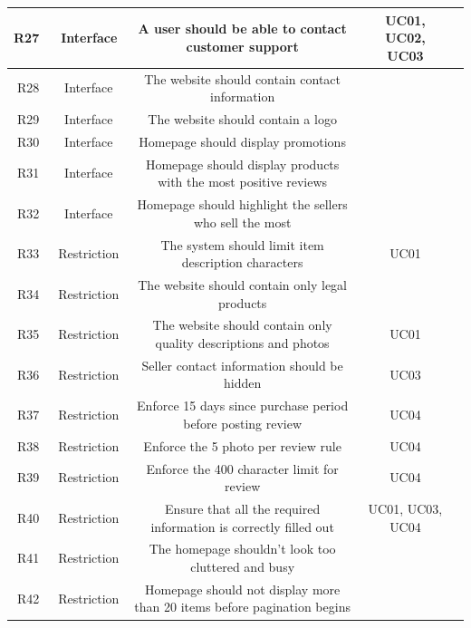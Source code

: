 \documentclass[11pt]{article}
\newcounter{use case ID}
\newcounter{req ID}
\begin{document}
\begin{table}[H]
\begin{adjustbox}{width=\columnwidth,center}
\begin{tabular}{|r | c| c | c| c|}
                R27 & \ Interface & A user should be able to contact customer support & UC01, UC02, UC03 &  \\
                \hline
                R28 & \ Interface & The website should contain contact \index{information}information & &  \\
                \hline
                R29 & \ Interface & The website should contain a logo & &  \\
                \hline
                R30 & \ Interface & Homepage should display promotions & &  \\
                \hline
                R31 & \ Interface & Homepage should display \index{product}products with the most positive \index{review}reviews & &  \\
                \hline
                R32 & \ Interface & Homepage should highlight the \index{seller}sellers who sell the most & &  \\
                \hline
                R33 & \ Restriction & The system should limit item description characters & UC01 &  \\
                \hline
                R34 & \ Restriction & The website should contain only legal \index{product}products & &  \\
                \hline
                R35 & \ Restriction & The website should contain only quality descriptions and photos & UC01 &  \\
                \hline
                R36 & \ Restriction & \index{seller}Seller contact \index{information}information should be hidden & UC03 &  \\
                \hline
                R37 & \ Restriction & Enforce 15 days since purchase period before posting review & UC04 &  \\
                \hline
                R38 & \ Restriction & Enforce the 5 photo per \index{review}review rule & UC04 &  \\
                \hline
                R39 & \ Restriction & Enforce the 400 character limit for review & UC04 &  \\
                \hline
                R40 & \ Restriction & Ensure that all the required \index{information}information is correctly filled out & UC01, UC03, UC04 &  \\
                \hline
                R41 & \ Restriction & The homepage shouldn't look too cluttered and busy & &  \\
                \hline
                R42 & \ Restriction & Homepage should not display more than 20 items before pagination begins & &  \\

\end{tabular}
\end{adjustbox}
\end{table}
\end{document}
